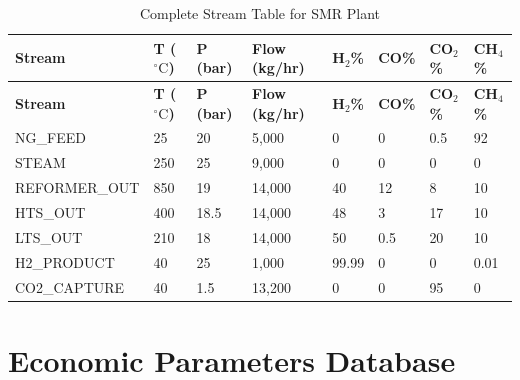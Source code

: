 \documentclass[12pt,twoside,openany]{book}
\newcommand{\unitdegree}{\ensuremath{^\circ\mathrm{C}}}
\begin{document}
\begingroup
\scriptsize
\setlength{\tabcolsep}{3pt}
\begin{longtable}{L{3.0cm} C{1.2cm} C{1.2cm} C{1.7cm} C{1.15cm} C{1.15cm} C{1.15cm} C{1.15cm}}
\caption{Complete Stream Table for SMR Plant}\label{tab:streams}\\
\hline
\textbf{Stream} & \textbf{T (\unitdegree)} & \textbf{P (bar)}
  & \textbf{Flow (kg/hr)} & \textbf{H$_2$\%}
  & \textbf{CO\%} & \textbf{CO$_2$\%} & \textbf{CH$_4$\%} \\
\hline
\endfirsthead
\hline
\textbf{Stream} & \textbf{T (\unitdegree)} & \textbf{P (bar)}
  & \textbf{Flow (kg/hr)} & \textbf{H$_2$\%}
  & \textbf{CO\%} & \textbf{CO$_2$\%} & \textbf{CH$_4$\%} \\
\hline
\endhead
NG\_FEED       & 25  & 20   & 5,000  & 0     & 0   & 0.5 & 92    \\
STEAM          & 250 & 25   & 9,000  & 0     & 0   & 0   & 0     \\
REFORMER\_OUT  & 850 & 19   & 14,000 & 40    & 12  & 8   & 10    \\
HTS\_OUT       & 400 & 18.5 & 14,000 & 48    & 3   & 17  & 10    \\
LTS\_OUT       & 210 & 18   & 14,000 & 50    & 0.5 & 20  & 10    \\
H2\_PRODUCT    & 40  & 25   & 1,000  & 99.99 & 0   & 0   & 0.01  \\
CO2\_CAPTURE   & 40  & 1.5  & 13,200 & 0     & 0   & 95  & 0     \\
\hline
\end{longtable}
\endgroup

\section{Economic Parameters Database}
\end{document}

